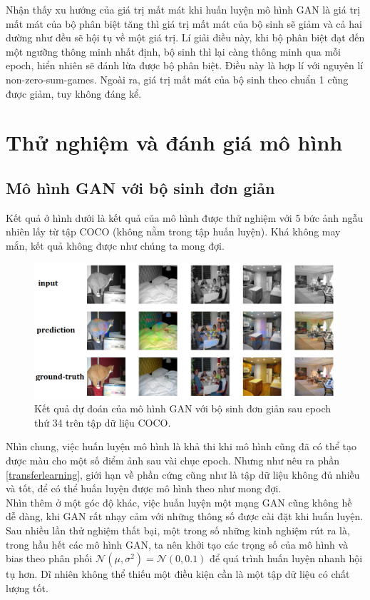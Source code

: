 \documentclass[a4paper, 12pt]{article}
\begin{document}
\noindent
Nhận thấy xu hướng của giá trị mất mát khi huấn luyện mô hình GAN là giá trị mất mát của bộ phân biệt tăng thì giá trị mất mát của bộ sinh sẽ giảm và cả hai dường như đều sẽ hội tụ về một giá trị. Lí giải điều này, khi bộ phân biệt đạt đến một ngưỡng thông minh nhất định, bộ sinh thì lại càng thông minh qua mỗi epoch, hiển nhiên sẽ đánh lừa được bộ phân biệt. Điều này là hợp lí với nguyên lí non-zero-sum-games. Ngoài ra, giá trị mất mát của bộ sinh theo chuẩn 1 cũng được giảm, tuy không đáng kể.

\section{Thử nghiệm và đánh giá mô hình}\label{testmodel}

\subsection{Mô hình GAN với bộ sinh đơn giản}\label{badexperiment}

Kết quả ở hình dưới là kết quả của mô hình được thử nghiệm với 5 bức ảnh ngẫu nhiên lấy từ tập COCO (không nằm trong tập huấn luyện). Khá không may mắn, kết quả không được như chúng ta mong đợi.

\begin{figure}[!h]
\captionsetup{width=0.8\textwidth}
\centering
\includegraphics[width=15cm]{images/4_0.png}
\caption{Kết quả dự đoán của mô hình GAN với bộ sinh đơn giản sau epoch thứ 34 trên tập dữ liệu COCO.}
\label{fig:worseexperiment}
\end{figure}

\noindent
Nhìn chung, việc huấn luyện mô hình là khả thi khi mô hình cũng đã có thể tạo được màu cho một số điểm ảnh sau vài chục epoch. Nhưng như nêu ra phần \ref{transferlearning}, giới hạn về phần cứng cũng như là tập dữ liệu không đủ nhiều và tốt, để có thể huấn luyện được mô hình theo như mong đợi.\vspace{5pt}\\
Nhìn thêm ở một góc độ khác, việc huấn luyện một mạng GAN cũng không hề dễ dàng, khi GAN rất nhạy cảm với những thông số được cài đặt khi huấn luyện. Sau nhiều lần thử nghiệm thất bại, một trong số những kinh nghiệm rút ra là, trong hầu hết các mô hình GAN, ta nên khởi tạo các trọng số của mô hình và bias theo phân phối $\mathcal{N}\left(\mu, \sigma^2\right) = \mathcal{N}\left(0, 0.1\right)$ để quá trình huấn luyện nhanh hội tụ hơn. Dĩ nhiên không thể thiếu một điều kiện cần là một tập dữ liệu có chất lượng tốt.
\end{document}
